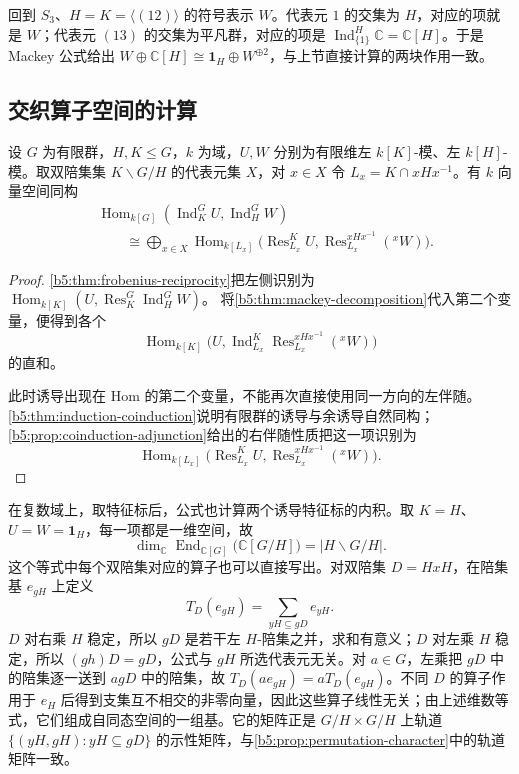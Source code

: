 \ProseParagraphBreak

回到 \(S_3\)、\(H=K=\langle(12)\rangle\) 的符号表示 \(W\)。代表元 \(1\) 的交集为 \(H\)，对应的项就是 \(W\)；代表元 \((13)\) 的交集为平凡群，对应的项是 \(\operatorname{Ind}_{\{1\}}^H\mathbb C=\mathbb C[H]\)。于是 Mackey 公式给出 \(W\oplus\mathbb C[H]\cong\mathbf1_H\oplus W^{\oplus2}\)，与上节直接计算的两块作用一致。

\subsection{交织算子空间的计算}
\label{b5:subsec:0402:02}

\begin{theorem}[交织空间公式]\label{b5:thm:mackey-intertwining}
	设 \(G\) 为有限群，\(H,K\leq G\)，\(k\) 为域，\(U,W\) 分别为有限维左 \(k[K]\)-模、左 \(k[H]\)-模。取双陪集集 \(K\backslash G/H\) 的代表元集 \(X\)，对 \(x\in X\) 令 \(L_x=K\cap xHx^{-1}\)。有 \(k\) 向量空间同构
	\begin{equation}\label{b5:eq:mackey-intertwining}
		\begin{aligned}
			&\operatorname{Hom}_{k[G]} \left(\operatorname{Ind}_K^G U,\operatorname{Ind}_H^G W\right)\\
			&\qquad\cong \bigoplus_{x\in X}\operatorname{Hom}_{k[L_x]} \bigl(\operatorname{Res}_{L_x}^K U, \operatorname{Res}_{L_x}^{xHx^{-1}}({}^xW)\bigr).
		\end{aligned}
	\end{equation}
\end{theorem}
\begin{proof}
	\cref{b5:thm:frobenius-reciprocity}把左侧识别为 \(\operatorname{Hom}_{k[K]}(U,\operatorname{Res}_K^G\operatorname{Ind}_H^G W)\)。 将\cref{b5:thm:mackey-decomposition}代入第二个变量，便得到各个
	\[
		\operatorname{Hom}_{k[K]} \bigl(U,\operatorname{Ind}_{L_x}^K \operatorname{Res}_{L_x}^{xHx^{-1}}({}^xW)\bigr)
	\]
	的直和。

	此时诱导出现在 Hom 的第二个变量，不能再次直接使用同一方向的左伴随。\cref{b5:thm:induction-coinduction}说明有限群的诱导与余诱导自然同构；\cref{b5:prop:coinduction-adjunction}给出的右伴随性质把这一项识别为
	\[
		\operatorname{Hom}_{k[L_x]} \bigl(\operatorname{Res}_{L_x}^K U, \operatorname{Res}_{L_x}^{xHx^{-1}}({}^xW)\bigr).
	\]
\end{proof}

在复数域上，取特征标后，公式也计算两个诱导特征标的内积。取 \(K=H\)、\(U=W=\mathbf1_H\)，每一项都是一维空间，故
\[
	\dim_{\mathbb C}\operatorname{End}_{\mathbb C[G]} \bigl(\mathbb C[G/H]\bigr)=|H\backslash G/H|.
\]
这个等式中每个双陪集对应的算子也可以直接写出。对双陪集 \(D=HxH\)，在陪集基 \(e_{gH}\) 上定义
\[
	T_D(e_{gH})=\sum_{yH\subseteq gD}e_{yH}.
\]
\(D\) 对右乘 \(H\) 稳定，所以 \(gD\) 是若干左 \(H\)-陪集之并，求和有意义；\(D\) 对左乘 \(H\) 稳定，所以 \((gh)D=gD\)，公式与 \(gH\) 所选代表元无关。对 \(a\in G\)，左乘把 \(gD\) 中的陪集逐一送到 \(agD\) 中的陪集，故 \(T_D(ae_{gH})=aT_D(e_{gH})\)。不同 \(D\) 的算子作用于 \(e_H\) 后得到支集互不相交的非零向量，因此这些算子线性无关；由上述维数等式，它们组成自同态空间的一组基。它的矩阵正是 \(G/H\times G/H\) 上轨道 \(\{(yH,gH):yH\subseteq gD\}\) 的示性矩阵，与\cref{b5:prop:permutation-character}中的轨道矩阵一致。

